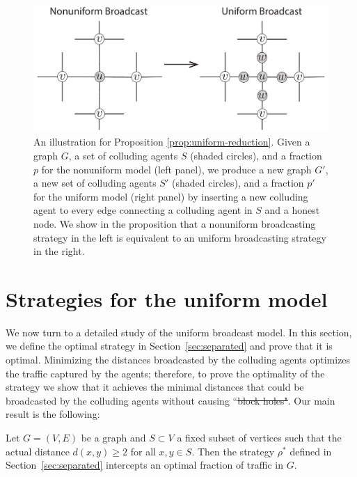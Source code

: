 \documentclass{comnet}
\providecommand{\DIFadd}[1]{{\protect\color{blue}\uwave{#1}}} %
\providecommand{\DIFdel}[1]{{\protect\color{red}\sout{#1}}}                      %
\providecommand{\DIFaddbegin}{} %
\providecommand{\DIFaddend}{} %
\providecommand{\DIFdelbegin}{} %
\providecommand{\DIFdelend}{} %
\begin{document}
\begin{figure}
\centering
\includegraphics[width=\textwidth]{images/reduction.pdf}
\caption{An illustration for Proposition \ref{prop:uniform-reduction}. Given a
graph $G$, a set of colluding agents $S$ (shaded circles), and a fraction $p$
for the nonuniform model (left panel), we produce a new graph $G'$, a new set
of colluding agents $S'$ (shaded circles), and a fraction $p'$ for the uniform
model (right panel) by inserting a new colluding agent to every edge connecting
a colluding agent in $S$ and a honest node. We show in the proposition that a
nonuniform broadcasting strategy in the left is equivalent to an uniform
broadcasting strategy in the right.} \label{fig:nonuniform-cycle}
\end{figure}

\section{Strategies for the uniform model} \label{sec:strategies}

We now turn to a detailed study of the uniform broadcast model. In this
section, we define the optimal strategy in Section~\ref{sec:separated} and
prove that it is optimal. Minimizing the distances broadcasted by the colluding
agents optimizes the traffic captured by the agents; therefore, to prove the
optimality of the strategy we show that it achieves the minimal distances that
could be broadcasted by the colluding agents without causing ``\DIFdelbegin \DIFdel{block holes"}\DIFdelend \DIFaddbegin \DIFadd{black holes''}\DIFaddend .
Our main result is the following:

\begin{theorem} \label{thm:optimal-separated}

Let $G = (V,E)$ be a graph and $S \subset V$ a fixed subset of vertices such
that the actual distance $d(x, y) \geq 2$ for all $x,y \in S$. Then the
strategy $\rho^*$ defined in Section~\ref{sec:separated} intercepts an optimal
fraction of traffic in $G$.

\end{theorem}
\end{document}
